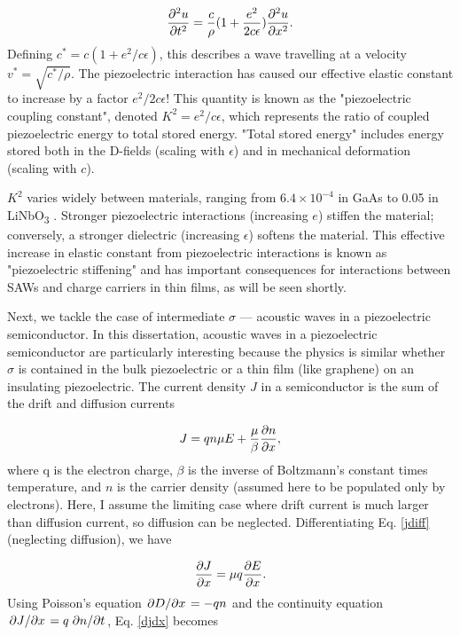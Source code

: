 \documentclass[double,12pt,1in]{beavtex}
\begin{document}
\begin{equation}
    \pdv[2]{u}{t} = \frac{c}{\rho} (1 + \frac{e^2}{2c\epsilon}) \pdv[2]{u}{x}. \label{wave eqn for insulator}
\end{equation}
Defining $c^* = c(1 + e^2/c\epsilon)$, this describes a wave travelling at a velocity $v^* =\sqrt{c^*/\rho}$. The piezoelectric interaction has caused our effective elastic constant to increase by a factor $e^2/2c\epsilon$! This quantity is known as the "piezoelectric coupling constant", denoted $K^2 = e^2/c\epsilon$, which represents the ratio of coupled piezoelectric energy to total stored energy. "Total stored energy" includes energy stored both in the D-fields (scaling with $\epsilon$) and in mechanical deformation (scaling with $c$). 

$K^2$ varies widely between materials, ranging from $6.4 \times 10^{-4}$ in GaAs \cite{wixforth_surface_1989} to 0.05 in LiNbO\textsubscript{3} \cite{warner_determination_1967}. Stronger piezoelectric interactions (increasing $e$) stiffen the material; conversely, a stronger dielectric (increasing $\epsilon$) softens the material. This effective increase in elastic constant from piezoelectric interactions is known as "piezoelectric stiffening" and has important consequences for interactions between SAWs and charge carriers in thin films, as will be seen shortly. 

Next, we tackle the case of intermediate $\sigma$ — acoustic waves in a piezoelectric semiconductor. In this dissertation, acoustic waves in a piezoelectric semiconductor are particularly interesting because the physics is similar whether $\sigma$ is contained in the bulk piezoelectric or a thin film (like graphene) on an insulating piezoelectric. The current density $J$ in a semiconductor is the sum of the drift and diffusion currents

\begin{equation}
    J = q n \mu E + \frac{\mu}{\beta} \pdv{n}{x}, \label{jdiff}
\end{equation}
where q is the electron charge, $\beta$ is the inverse of Boltzmann's constant times temperature, and $n$ is the carrier density (assumed here to be populated only by electrons). Here, I assume the limiting case where drift current is much larger than diffusion current, so diffusion can be neglected. Differentiating Eq. \ref{jdiff} (neglecting diffusion), we have

\begin{equation}
    \pdv{J}{x} = \mu q \pdv{E}{x}. \label{djdx}
\end{equation}
Using Poisson's equation $\pdv*{D}{x} = -qn$ and the continuity equation $\pdv*{J}{x} = q \pdv*{n}{t}$, Eq. \ref{djdx} becomes
\end{document}
